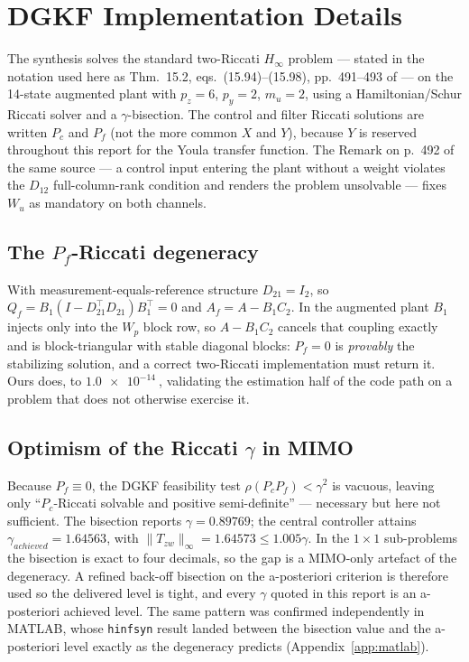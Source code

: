 \documentclass[energies,article,submit,pdftex,oneauthor]{Definitions/mdpi}
\begin{document}
\section{DGKF Implementation Details}
\label{app:dgkf}

The synthesis solves the standard two-Riccati $H_\infty$ problem \citep{doyle1989state} --- stated
in the notation used here as Thm.~15.2, eqs.~(15.94)--(15.98), pp.~491--493 of
\citep{assadian2020neoclassical} --- on the
14-state augmented plant with $p_z = 6$, $p_y = 2$, $m_u = 2$, using a Hamiltonian/Schur Riccati
solver and a $\gamma$-bisection. The control and filter Riccati solutions are written $P_c$ and
$P_f$ (not the more common $X$ and $Y$), because $Y$ is reserved throughout this report for the
Youla transfer function. The Remark on p.~492 of the same source --- a control input entering the
plant without a weight violates the $D_{12}$ full-column-rank condition and renders the problem
unsolvable --- fixes $W_u$ as mandatory on both channels.

\subsection{The $P_f$-Riccati degeneracy}
With measurement-equals-reference structure $D_{21} = I_2$, so
$Q_f = B_1(I - D_{21}^\top D_{21})B_1^\top = 0$ and $A_f = A - B_1 C_2$. In the augmented plant
$B_1$ injects only into the $W_p$ block row, so $A - B_1 C_2$ cancels that coupling exactly and is
block-triangular with stable diagonal blocks: $P_f = 0$ is \emph{provably} the stabilizing solution,
and a correct two-Riccati implementation must return it. Ours does, to $\SI{1.0e-14}{}$,
validating the estimation half of the code path on a problem that does not otherwise exercise it.

\subsection{Optimism of the Riccati $\gamma$ in MIMO}
Because $P_f\equiv0$, the DGKF feasibility test $\rho(P_c P_f)<\gamma^2$ is vacuous, leaving only
``$P_c$-Riccati solvable and positive semi-definite'' --- necessary but here not sufficient. The bisection
reports $\gamma = 0.89769$; the central controller attains $\gamma_{achieved} = 1.64563$, with
$\|T_{zw}\|_\infty = 1.64573 \le 1.005\gamma$. In the $1\times1$ sub-problems the bisection is
exact to four decimals, so the gap is a MIMO-only artefact of the degeneracy. A refined back-off
bisection on the a-posteriori criterion is therefore used so the delivered level is tight, and
every $\gamma$ quoted in this report is an a-posteriori achieved level. The same pattern was
confirmed independently in MATLAB, whose \texttt{hinfsyn} result landed between the bisection
value and the a-posteriori level exactly as the degeneracy predicts
(Appendix~\ref{app:matlab}).
\end{document}
